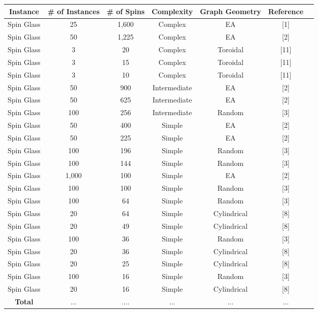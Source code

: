 \documentclass{standalone}
\begin{document}
\begin{tabular}{ |c|c|c|c|c|c|c| } 
    \hline
    \textbf{Instance} & \textbf{\# of Instances} & \textbf{\# of Spins} & \textbf{Complexity} & \textbf{Graph Geometry} & \textbf{Reference}\\ 
    \hline
    Spin Glass & 25 & 1,600 & Complex & EA & [1] \\
    Spin Glass & 50 & 1,225 & Complex & EA & [2] \\
    Spin Glass & 3 & 20 & Complex & Toroidal & [11] \\
    Spin Glass & 3 & 15 & Complex & Toroidal & [11] \\
    Spin Glass & 3 & 10 & Complex & Toroidal & [11] \\
    Spin Glass & 50 & 900 & Intermediate & EA & [2] \\
    Spin Glass & 50 & 625 & Intermediate & EA & [2] \\
    Spin Glass & 100 & 256 & Intermediate & Random & [3] \\
    Spin Glass & 50 & 400 & Simple & EA & [2] \\
    Spin Glass & 50 & 225 & Simple & EA & [2] \\
    Spin Glass & 100 & 196 & Simple & Random & [3] \\
    Spin Glass & 100 & 144 & Simple & Random & [3] \\
    Spin Glass & 1,000 & 100 & Simple & EA & [2] \\
    Spin Glass & 100 & 100 & Simple & Random & [3] \\
    Spin Glass & 100 & 64 & Simple & Random & [3] \\
    Spin Glass & 20 & 64 & Simple & Cylindrical & [8] \\
    Spin Glass & 20 & 49 & Simple & Cylindrical & [8] \\
    Spin Glass & 100 & 36 & Simple & Random & [3] \\
    Spin Glass & 20 & 36 & Simple & Cylindrical & [8] \\
    Spin Glass & 20 & 25 & Simple & Cylindrical & [8] \\
    Spin Glass & 100 & 16 & Simple & Random & [3] \\
    Spin Glass & 20 & 16 & Simple & Cylindrical & [8] \\
    \hline
    \textbf{Total} & ... & .... & ... & ... & ... \\
    \hline
\end{tabular}
\end{document}

